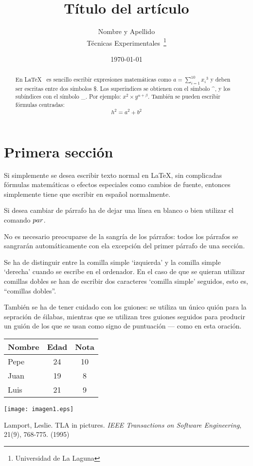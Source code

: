 \documentclass[a4paper,12pt]{article}
\begin{document}
\title{Título del artículo}
\author{Nombre y Apellido \\
	Técnicas Experimentales~\footnote{Universidad de La Laguna}
	}
\date{\today}
\maketitle
\begin{abstract}
  En \LaTeX{}~\cite{Lam:86} es sencillo escribir expresiones
  matemáticas como $a=\sum_{i=1}^{10} {x_i}^{3}$
  y deben ser escritas entre dos símbolos \$.
  Los superíndices se obtienen con el símbolo \^{}, y
  los subíndices con el símbolo \_.
  Por ejemplo: $x^2\times y ^{\alpha + \beta}$.
  También se pueden escribir fórmulas centradas:
  \[h^2=a^2 + b^2 \]
\end{abstract}

\section{Primera sección}
 Si simplemente se desea escribir texto normal en LaTeX,
 sin complicadas f\'ormulas matem\'aticas o efectos especiales
 como cambios de fuente, entonces simplemente tiene que escribir
 en espa\~nol normalmente.\par
 Si desea cambiar de párrafo ha de dejar una línea en blanco o bien
utilizar el comando $\\par$.

 No es necesario preocuparse de la sangría de los párrafos:
 todos los párrafos se sangrarán automáticamente con ela excepción
 del primer párrafo de una sección.
 
 Se ha de distinguir entre la comilla simple `izquierda'
 y la comilla simple `derecha' cuando se escribe en el ordenador.
 En el caso de que se quieran utilizar comillas dobles se han de
 escribir dos caracteres `comilla simple' seguidos, esto es,
 ``comillas dobles''.
 
 También se ha de tener cuidado con los guiones: se utiliza un único
 quión para la sepración de śilabas, mientras que se utilizan
 tres guiones seguidos para producir un guión de los que se usan
 como signo de puntuación --- como en esta oración.
 
 \bigskip 
 \begin{tabular}{|l|c|c|}
  \hline
    Nombre & Edad & Nota \\ \hline
    Pepe   &   24 &   10 \\ \hline
    Juan   &   19 &    8 \\ \hline
    Luis   &   21 &    9 \\ \hline
 \end{tabular}
 \texttt{[image: imagen1.eps]}
 \begin{thebibliography}{00}
    Lamport, Leslie.
    TLA in pictures.
    \emph{IEEE Transactions on Software Engineering},
    21(9), 768-775.
    (1995)
  
 \end{thebibliography}
 
 
\end{document}
